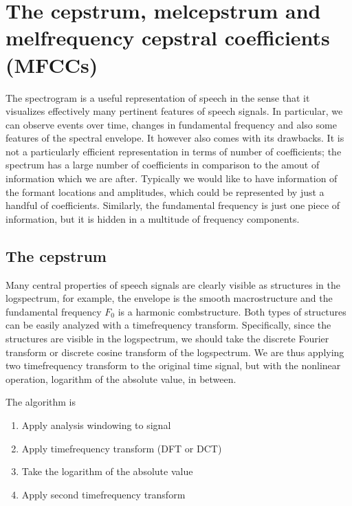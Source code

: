 \documentclass[letterpaper,10pt,english]{jupyterBook}
\begin{document}
\section{The cepstrum, mel\sphinxhyphen{}cepstrum and mel\sphinxhyphen{}frequency cepstral coefficients (MFCCs)}
\label{\detokenize{Representations/Melcepstrum:the-cepstrum-mel-cepstrum-and-mel-frequency-cepstral-coefficients-mfccs}}\label{\detokenize{Representations/Melcepstrum::doc}}
\sphinxAtStartPar
The spectrogram is a useful representation of speech in the sense that it visualizes effectively many pertinent features of speech signals. In particular, we can observe events over time, changes in fundamental frequency and also some features of the spectral envelope. It however also comes with its drawbacks. It is not a particularly efficient representation in terms of number of coefficients; the spectrum has a large number of coefficients in comparison to the amout of information which we are after. Typically we would like to have information of the formant locations and amplitudes, which could be represented by just a handful of coefficients. Similarly, the fundamental frequency is just one piece of information, but it is hidden in a multitude of frequency components.


\subsection{The cepstrum}
\label{\detokenize{Representations/Melcepstrum:the-cepstrum}}
\sphinxAtStartPar
Many central properties of speech signals are clearly visible as structures in the log\sphinxhyphen{}spectrum, for example, the envelope is the smooth macro\sphinxhyphen{}structure and the fundamental frequency \(F_0\) is a harmonic comb\sphinxhyphen{}structure. Both types of structures can be easily analyzed with a time\sphinxhyphen{}frequency transform. Specifically, since the structures are visible in the log\sphinxhyphen{}spectrum, we should take the discrete Fourier transform or discrete cosine transform of the log\sphinxhyphen{}spectrum. We are thus applying two time\sphinxhyphen{}frequency transform to the original time signal, but with the non\sphinxhyphen{}linear operation, logarithm of the absolute value, in between.

\sphinxAtStartPar
The algorithm is
\begin{enumerate}
%
\item {} 
\sphinxAtStartPar
Apply analysis windowing to signal

\item {} 
\sphinxAtStartPar
Apply time\sphinxhyphen{}frequency transform (DFT or DCT)

\item {} 
\sphinxAtStartPar
Take the logarithm of the absolute value

\item {} 
\sphinxAtStartPar
Apply second time\sphinxhyphen{}frequency transform

\end{enumerate}
\end{document}
